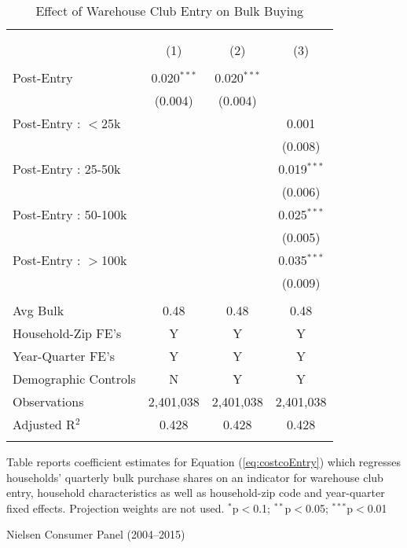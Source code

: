 \begin{table}[!htbp] \centering
  \caption{Effect of Warehouse Club Entry on Bulk Buying}
  \label{tab:costcoEntryDD}
\begin{tabular}{@{\extracolsep{5pt}}lccc}
\\[-1.8ex]\hline
\hline \\[-1.8ex]
\\[-1.8ex] & (1) & (2) & (3)\\
\hline \\[-1.8ex]
 Post-Entry & 0.020$^{***}$ & 0.020$^{***}$ &  \\
  & (0.004) & (0.004) &  \\
  Post-Entry : $<$25k &  &  & 0.001 \\
  &  &  & (0.008) \\
  Post-Entry : 25-50k &  &  & 0.019$^{***}$ \\
  &  &  & (0.006) \\
  Post-Entry : 50-100k &  &  & 0.025$^{***}$ \\
  &  &  & (0.005) \\
  Post-Entry : $>$100k &  &  & 0.035$^{***}$ \\
  &  &  & (0.009) \\
 \hline \\[-1.8ex]
 Avg Bulk & 0.48 & 0.48 & 0.48 \\
Household-Zip FE's & Y & Y & Y \\
Year-Quarter FE's & Y & Y & Y \\
Demographic Controls & N & Y & Y \\
Observations & 2,401,038 & 2,401,038 & 2,401,038 \\
Adjusted R$^{2}$ & 0.428 & 0.428 & 0.428 \\
\hline
\hline \\[-1.8ex]
\end{tabular}
\begin{tablenotes}
Table reports coefficient estimates for Equation (\ref{eq:costcoEntry}) which regresses households' quarterly bulk purchase shares on an indicator for warehouse club entry, household characteristics as well as household-zip code and year-quarter fixed effects. Projection weights are not used. $^{*}$p$<$0.1; $^{**}$p$<$0.05; $^{***}$p$<$0.01
\end{tablenotes}
\begin{tablenotes}[Source]
Nielsen Consumer Panel (2004--2015)
\end{tablenotes}
\end{table}
